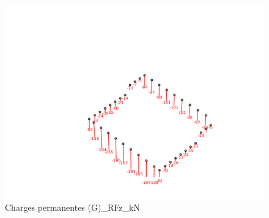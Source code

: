    \begin{figure}[H] %
        \centering %
        \includegraphics[width=\textwidth]{assets/img/graph3D_charges_cas_1_RFz_kN.png} %
        \caption{Charges permanentes (G)\_RFz\_kN} %
    \end{figure}

    